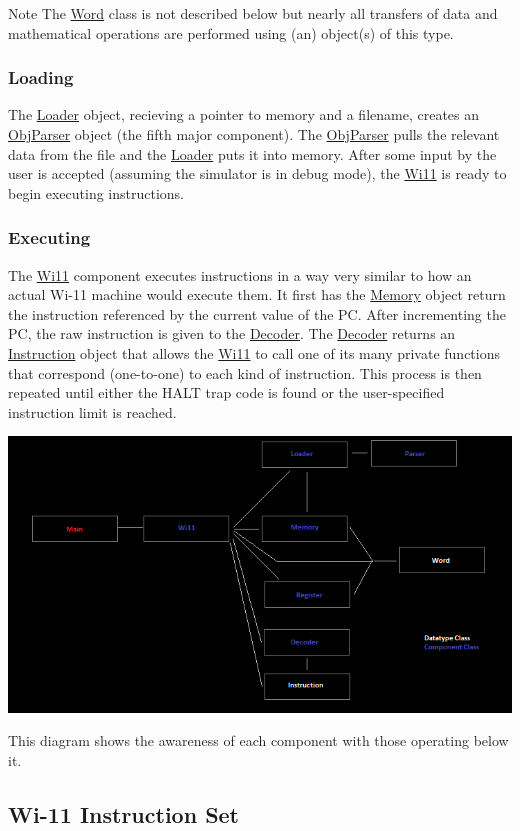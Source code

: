 \begin{DoxyNote}{Note}
The \hyperlink{classWord}{Word} class is not described below but nearly all transfers of data and mathematical operations are performed using (an) object(s) of this type.
\end{DoxyNote}
\hypertarget{index_loading}{}\subsubsection{Loading}\label{index_loading}
The \hyperlink{classLoader}{Loader} object, recieving a pointer to memory and a filename, creates an \hyperlink{classObjParser}{ObjParser} object (the fifth major component). The \hyperlink{classObjParser}{ObjParser} pulls the relevant data from the file and the \hyperlink{classLoader}{Loader} puts it into memory. After some input by the user is accepted (assuming the simulator is in debug mode), the \hyperlink{classWi11}{Wi11} is ready to begin executing instructions.\hypertarget{index_execution}{}\subsubsection{Executing}\label{index_execution}
The \hyperlink{classWi11}{Wi11} component executes instructions in a way very similar to how an actual Wi-\/11 machine would execute them. It first has the \hyperlink{classMemory}{Memory} object return the instruction referenced by the current value of the PC. After incrementing the PC, the raw instruction is given to the \hyperlink{classDecoder}{Decoder}. The \hyperlink{classDecoder}{Decoder} returns an \hyperlink{structInstruction}{Instruction} object that allows the \hyperlink{classWi11}{Wi11} to call one of its many private functions that correspond (one-\/to-\/one) to each kind of instruction. This process is then repeated until either the HALT trap code is found or the user-\/specified instruction limit is reached.


\begin{DoxyImage}
\includegraphics[width=\textwidth]{software_interaction.png}
\caption{This diagram shows the awareness of each component with those operating below it.}
\end{DoxyImage}
\hypertarget{index_instructions}{}\subsection{Wi-\/11 Instruction Set}\label{index_instructions}
